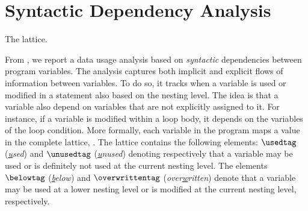 \section{Syntactic Dependency Analysis}


\begin{marginfigure}
  \centering
  \caption{The \usage{} lattice.}
\end{marginfigure}

From , we report a data usage analysis based on \emph{syntactic} dependencies between program variables.
The analysis captures both implicit and explicit flows of information between variables.
To do so, it tracks when a variable is used or modified in a statement also based on the nesting level. The idea is that a variable also depend on variables that are not explicitly assigned to it.
For instance, if a variable is modified within a loop body, it depends on the variables of the loop condition.
More formally, each variable in the program maps a value in the \usage{} complete lattice, .
The lattice contains the following elements: $\usedtag$ (\emph{\underline{u}sed}) and $\unusedtag$ (\emph{\underline{u}nused}) denoting respectively that a variable may be used or is definitely not used at the current nesting level.
The elements $\belowtag$ (\emph{\underline{b}elow}) and $\overwrittentag$ (\emph{over\underline{w}ritten}) denote that a variable may be used at a lower nesting level or is modified at the current nesting level, respectively.

